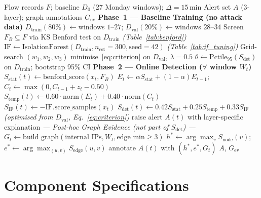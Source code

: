 \documentclass[journal,10pt,twoside]{IEEEtran}
\begin{document}
\begin{algorithm}[t]
\caption{3-Layer Detection + Post-hoc Graph Evidence (v6)}
\label{alg:framework}
\small
\begin{algorithmic}[1]
\Require Flow records $F$; baseline $D_0$ (27 Monday windows);
  $\Delta{=}15\,\text{min}$
\Ensure Alert set $A$ (3-layer); graph annotations $G_{\mathrm{ev}}$
\Statex \textbf{Phase~1 --- Baseline Training (no attack data)}
\State $D_{\mathrm{train}}(80\%)\!\leftarrow\!$windows $1$--$27$;\;
  $D_{\mathrm{val}}(20\%)\!\leftarrow\!$windows $28$--$34$
\State Screen $F_B\!\subseteq\!F$ via KS Benford test on
  $D_{\mathrm{train}}$ \hfill\textit{(Table~\ref{tab:benford})}
\State $\mathrm{IF}\leftarrow\mathrm{IsolationForest}(
  D_{\mathrm{train}},n_{\mathrm{est}}{=}300,\text{seed}{=}42)$
  \hfill\textit{(Table~\ref{tab:if_tuning})}
\State Grid-search $(w_1,w_2,w_3)$ minimise~\eqref{eq:criterion}
  on $D_{\mathrm{val}}$, $\lambda{=}0.5$
\State $\theta\leftarrow\mathrm{Pctile}_{95}(S_{\mathrm{det}})$
  on $D_{\mathrm{train}}$; bootstrap 95\% CI
\Statex \textbf{Phase~2 --- Online Detection
  ($\forall$ window $W_t$)}
\State $S_{\mathrm{stat}}(t)\leftarrow
  \mathrm{benford\_score}(x_t,F_B)$
\State $E_t\leftarrow\alpha S_{\mathrm{stat}}
  +(1{-}\alpha)E_{t-1}$;\;
  $C_t\leftarrow\max(0,C_{t-1}+z_t-0.50)$
\State $S_{\mathrm{temp}}(t)\leftarrow
  0.60{\cdot}\mathrm{norm}(E_t)+0.40{\cdot}\mathrm{norm}(C_t)$
\State $S_{\mathrm{IF}}(t)\leftarrow
  {-}\mathrm{IF.score\_samples}(x_t)$
\State $S_{\mathrm{det}}(t)\leftarrow
  0.42S_{\mathrm{stat}}+0.25S_{\mathrm{temp}}
  +0.33S_{\mathrm{IF}}$
  \hfill\textit{(optimised from $D_{\mathrm{val}}$,
    Eq.~\eqref{eq:criterion})}
  raise alert $A(t)$ with layer-specific explanation
\EndIf
\Statex\textit{--- Post-hoc Graph Evidence
  (not part of $S_{\mathrm{det}}$) ---}
\State $G_t\leftarrow\mathrm{build\_graph}(\text{internal IPs},
  W_t,\text{edge\_min}{\ge}3)$
\State $h^*\!\leftarrow\!\arg\max_v S_{\mathrm{node}}(v)$;\;
  $e^*\!\leftarrow\!\arg\max_{(u,v)} S_{\mathrm{edge}}(u,v)$
  annotate $A(t)$ with $(h^*,e^*,G_t)$
\EndIf
\State \Return $A$, $G_{\mathrm{ev}}$
\end{algorithmic}
\end{algorithm}

\section{Component Specifications}
\label{sec:components}
\end{document}

